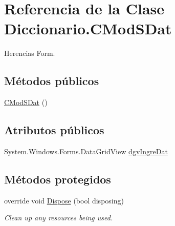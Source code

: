 \hypertarget{class_diccionario_1_1_c_mod_s_dat}{\section{Referencia de la Clase Diccionario.\-C\-Mod\-S\-Dat}
\label{class_diccionario_1_1_c_mod_s_dat}
}


Herencias Form.

\subsection*{Métodos públicos}
\begin{DoxyCompactItemize}
\item 
\hyperlink{class_diccionario_1_1_c_mod_s_dat_af8b27c60f399df435007e2a13960acae}{C\-Mod\-S\-Dat} ()
\end{DoxyCompactItemize}
\subsection*{Atributos públicos}
\begin{DoxyCompactItemize}
\item 
System.\-Windows.\-Forms.\-Data\-Grid\-View \hyperlink{class_diccionario_1_1_c_mod_s_dat_ac48434ecfc8f8ad8cd8e9eec900ac24c}{dgv\-Ingre\-Dat}
\end{DoxyCompactItemize}
\subsection*{Métodos protegidos}
\begin{DoxyCompactItemize}
\item 
override void \hyperlink{class_diccionario_1_1_c_mod_s_dat_a91488b6e3055fb6d6d2aebd4db05cc6d}{Dispose} (bool disposing)
\begin{DoxyCompactList}\small\item\em Clean up any resources being used. \end{DoxyCompactList}\end{DoxyCompactItemize}
